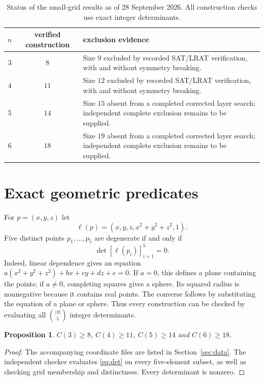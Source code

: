 \documentclass[11pt,a4paper]{article}
\newtheorem{proposition}{Proposition}[section]
\begin{document}
\begin{table}[ht]
\centering\small
\begin{tabular}{@{}c c p{8.6cm}@{}}
\toprule
$n$ & verified construction & exclusion evidence \\
\midrule
3 & $8$ & Size $9$ excluded by recorded SAT/LRAT verification, with and without symmetry breaking. \\
4 & $11$ & Size $12$ excluded by recorded SAT/LRAT verification, with and without symmetry breaking. \\
5 & $14$ & Size $15$ absent from a completed corrected layer search; independent complete exclusion remains to be supplied. \\
6 & $18$ & Size $19$ absent from a completed corrected layer search; independent complete exclusion remains to be supplied. \\
\bottomrule
\end{tabular}
\caption{Status of the small-grid results as of 28 September 2026. All construction checks use exact integer determinants.}\label{tab:status}
\end{table}

\section{Exact geometric predicates}
For $p=(x,y,z)$ let
\[
 \ell(p)=(x,y,z,x^2+y^2+z^2,1).
\]
Five distinct points $p_1,\ldots,p_5$ are degenerate if and only if
\begin{equation}\label{eq:det}
 \det[\ell(p_i)]_{i=1}^{5}=0.
\end{equation}
Indeed, linear dependence gives an equation
$a(x^2+y^2+z^2)+bx+cy+dz+e=0$. If $a=0$, this defines a plane containing the points; if $a\ne0$, completing squares gives a sphere. Its squared radius is nonnegative because it contains real points. The converse follows by substituting the equation of a plane or sphere. Thus every construction can be checked by evaluating all $\binom{|S|}{5}$ integer determinants.

\begin{proposition}\label{prop:lower}
$C(3)\ge8$, $C(4)\ge11$, $C(5)\ge14$ and $C(6)\ge18$.
\end{proposition}
\begin{proof}
The accompanying coordinate files are listed in Section~\ref{sec:data}. The independent checker evaluates \eqref{eq:det} on every five-element subset, as well as checking grid membership and distinctness. Every determinant is nonzero.
\end{proof}
\end{document}
